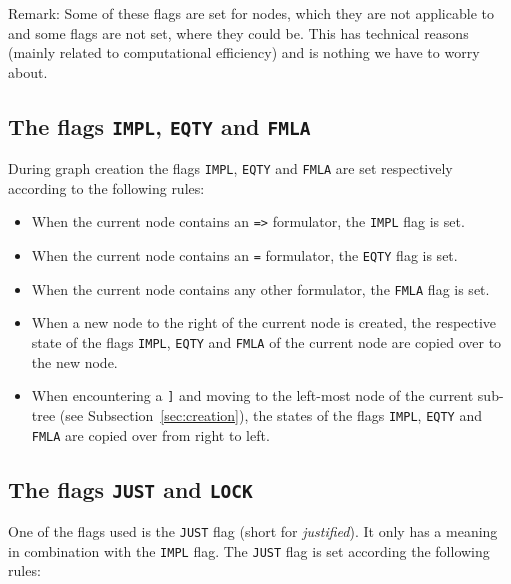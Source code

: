 \documentclass[british]{article}
\newcommand\prv{bc}
\newcommand\m[1]{\texttt{#1}}
\begin{document}
Remark: Some of these flags are set for nodes, which they are not applicable to
and some flags are not set, where they could be.
This has technical reasons (mainly related to computational efficiency) and is
nothing we have to worry about.

\pagebreak{}

\subsection{The flags \texttt{IMPL}, \texttt{EQTY} and \texttt{FMLA}}
During graph creation the flags \texttt{IMPL},
\texttt{EQTY} and \texttt{FMLA} are set respectively according to the following
rules:

\begin{itemize}
	\item
		When the current node contains an \m{=>} formulator, the \texttt{IMPL}
		flag is set.
	\item
		When the current node contains an \m{=} formulator, the \texttt{EQTY}
		flag is set.
	\item
		When the current node contains any other formulator, the \texttt{FMLA}
		flag is set.
	\item
		When a new node to the right of the current node is created, the
		respective state of the flags \texttt{IMPL}, \texttt{EQTY} and
		\texttt{FMLA} of the current node are copied over to the new node.
	\item
		When encountering a \m{]} and moving to the left-most node of the
		current sub-tree (see Subsection~\ref{sec:creation}), the states of the
		flags \texttt{IMPL}, \texttt{EQTY} and \texttt{FMLA} are copied over
		from right to left.
\end{itemize}

\subsection{The flags \texttt{JUST} and \texttt{LOCK}}

One of the flags used is the \texttt{JUST} flag (short for \emph{justified}). It
only has a meaning in combination with the \texttt{IMPL} flag. 
\medskip
The \texttt{JUST} flag is set according the following rules:
\end{document}
